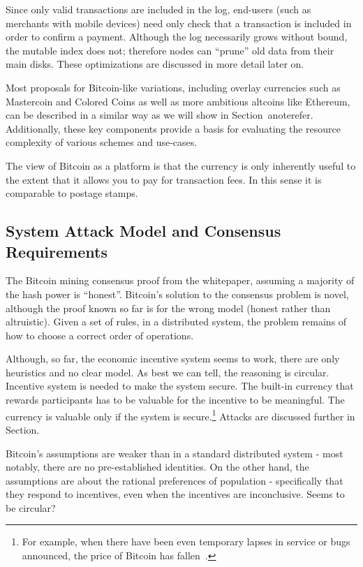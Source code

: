 Since only valid transactions are included in the log, end-users (such as merchants with mobile devices) need only check that a transaction is included in order to confirm a payment. Although the log necessarily grows without bound, the mutable index does not; therefore nodes can ``prune'' old data from their main disks. These optimizations are discussed in more detail later on.

Most proposals for Bitcoin-like variations, including overlay currencies such as Mastercoin and Colored Coins as well as more ambitious altcoins like Ethereum, can be described in a similar way as we will show in Section~anote{refer}. Additionally, these key components provide a basis for evaluating the resource complexity of various schemes and use-cases.

The view of Bitcoin as a platform is that the currency is only inherently useful to the extent that it allows you to pay for transaction fees. In this sense it is comparable to postage stamps.


\subsection{System Attack Model and Consensus Requirements}

The Bitcoin mining consensus proof from the whitepaper, assuming a majority of the hash power is ``honest''. Bitcoin's solution to the consensus problem is novel, although the proof known so far is for the wrong model (honest rather than altruistic). Given a set of rules, in a distributed system, the problem remains of how to choose a correct order of operations.

Although, so far, the economic incentive system seems to work, there are only heuristics and no clear model. As best we can tell, the reasoning is circular. Incentive system is needed to make the system secure. The built-in currency that rewards participants has to be valuable for the incentive to be meaningful. The currency is valuable only if the system is secure.\footnote{For example, when there have been even temporary lapses in service or bugs announced, the price of Bitcoin has fallen~\cite{bitcoin-fork-news}.} Attacks are discussed further in Section.

Bitcoin's assumptions are weaker than in a standard distributed system - most notably, there are no pre-established identities. On the other hand, the assumptions are about the rational preferences of population - specifically that they respond to incentives, even when the incentives are inconclusive. Seems to be circular?

